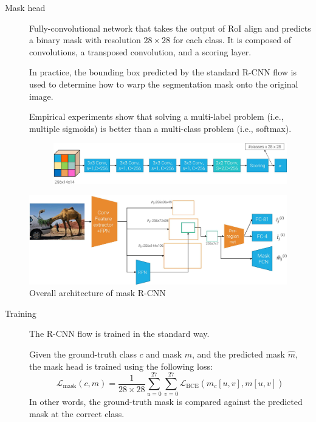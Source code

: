 \begin{description}
\begin{description}
            \item[Mask head] 
                Fully-convolutional network that takes the output of RoI align and predicts a binary mask with resolution $28 \times 28$ for each class. It is composed of convolutions, a transposed convolution, and a scoring layer.

                In practice, the bounding box predicted by the standard R-CNN flow is used to determine how to warp the segmentation mask onto the original image.

                \begin{remark}
                    Empirical experiments show that solving a multi-label problem (i.e., multiple sigmoids) is better than a multi-class problem (i.e., softmax).
                \end{remark}

                \begin{figure}[H]
                    \centering
                    \includegraphics[width=0.85\linewidth]{./img/_mask_rcnn_head.jpg}
                \end{figure}
        \end{description}

        \begin{figure}[H]
            \centering
            \includegraphics[width=0.85\linewidth]{./img/_mask_rcnn.jpg}
            \caption{Overall architecture of mask R-CNN}
        \end{figure}

        \begin{description}
        \item[Training]
            The R-CNN flow is trained in the standard way. 

            Given the ground-truth class $c$ and mask $m$, and the predicted mask $\hat{m}$, the mask head is trained using the following loss:
            \[ \mathcal{L}_\text{mask}(c, m) = \frac{1}{28 \times 28} \sum_{u=0}^{27} \sum_{v=0}^{27} \mathcal{L}_\text{BCE}\left( \hat{m}_{c}[u, v], m[u, v] \right) \]
            In other words, the ground-truth mask is compared against the predicted mask at the correct class.


\end{description}
\end{description}
